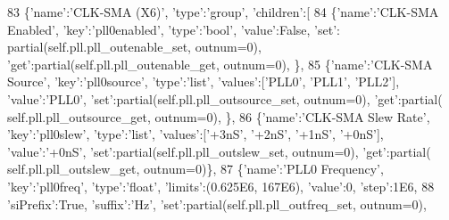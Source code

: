 \begin{DoxyCode}
83                 \{\textcolor{stringliteral}{'name'}:\textcolor{stringliteral}{'CLK-SMA (X6)'}, \textcolor{stringliteral}{'type'}:\textcolor{stringliteral}{'group'}, \textcolor{stringliteral}{'children'}:[
84                     \{\textcolor{stringliteral}{'name'}:\textcolor{stringliteral}{'CLK-SMA Enabled'}, \textcolor{stringliteral}{'key'}:\textcolor{stringliteral}{'pll0enabled'}, \textcolor{stringliteral}{'type'}:\textcolor{stringliteral}{'bool'}, \textcolor{stringliteral}{'value'}:\textcolor{keyword}{False}, \textcolor{stringliteral}{'set'}:
      partial(self.pll.pll\_outenable\_set, outnum=0), \textcolor{stringliteral}{'get'}:partial(self.pll.pll\_outenable\_get, outnum=0), \},
85                     \{\textcolor{stringliteral}{'name'}:\textcolor{stringliteral}{'CLK-SMA Source'}, \textcolor{stringliteral}{'key'}:\textcolor{stringliteral}{'pll0source'}, \textcolor{stringliteral}{'type'}:\textcolor{stringliteral}{'list'}, \textcolor{stringliteral}{'values'}:[\textcolor{stringliteral}{'PLL0'}, \textcolor{stringliteral}{'PLL1'}, \textcolor{stringliteral}{
      'PLL2'}], \textcolor{stringliteral}{'value'}:\textcolor{stringliteral}{'PLL0'}, \textcolor{stringliteral}{'set'}:partial(self.pll.pll\_outsource\_set, outnum=0), \textcolor{stringliteral}{'get'}:partial(
      self.pll.pll\_outsource\_get, outnum=0), \},
86                     \{\textcolor{stringliteral}{'name'}:\textcolor{stringliteral}{'CLK-SMA Slew Rate'}, \textcolor{stringliteral}{'key'}:\textcolor{stringliteral}{'pll0slew'}, \textcolor{stringliteral}{'type'}:\textcolor{stringliteral}{'list'}, \textcolor{stringliteral}{'values'}:[\textcolor{stringliteral}{'+3nS'}, \textcolor{stringliteral}{'+2nS'},
       \textcolor{stringliteral}{'+1nS'}, \textcolor{stringliteral}{'+0nS'}], \textcolor{stringliteral}{'value'}:\textcolor{stringliteral}{'+0nS'}, \textcolor{stringliteral}{'set'}:partial(self.pll.pll\_outslew\_set, outnum=0), \textcolor{stringliteral}{'get'}:partial(
      self.pll.pll\_outslew\_get, outnum=0)\},
87                     \{\textcolor{stringliteral}{'name'}:\textcolor{stringliteral}{'PLL0 Frequency'}, \textcolor{stringliteral}{'key'}:\textcolor{stringliteral}{'pll0freq'}, \textcolor{stringliteral}{'type'}:\textcolor{stringliteral}{'float'}, \textcolor{stringliteral}{'limits'}:(0.625E6, 167E6), \textcolor{stringliteral}{
      'value'}:0, \textcolor{stringliteral}{'step'}:1E6,
88                         \textcolor{stringliteral}{'siPrefix'}:\textcolor{keyword}{True}, \textcolor{stringliteral}{'suffix'}:\textcolor{stringliteral}{'Hz'}, \textcolor{stringliteral}{'set'}:partial(self.pll.pll\_outfreq\_set, outnum=0), \textcolor{stringliteral}{
}
\end{DoxyCode}
